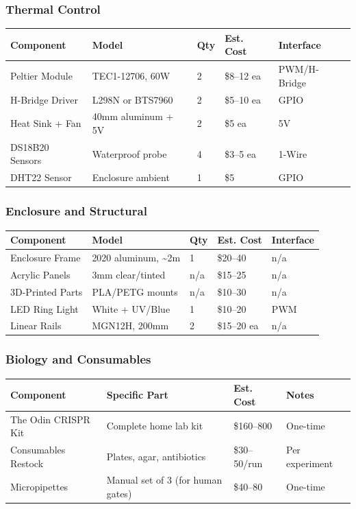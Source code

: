 \documentclass[11pt,letterpaper]{article}
\begin{document}
\subsubsection{Thermal Control}

{\centering\begin{tabularx}{\textwidth}{Y L{4.2cm} L{0.9cm} L{2.3cm} L{2.4cm}}
\toprule
\textbf{Component} & \textbf{Model} & \textbf{Qty} & \textbf{Est. Cost} & \textbf{Interface} \\
\midrule
Peltier Module & TEC1-12706, 60W & 2 & \$8--12 ea & PWM/H-Bridge \\
H-Bridge Driver & L298N or BTS7960 & 2 & \$5--10 ea & GPIO \\
Heat Sink + Fan & 40mm aluminum + 5V & 2 & \$5 ea & 5V \\
DS18B20 Sensors & Waterproof probe & 4 & \$3--5 ea & 1-Wire \\
DHT22 Sensor & Enclosure ambient & 1 & \$5 & GPIO \\
\bottomrule
\end{tabularx}\par}

\subsubsection{Enclosure and Structural}

{\centering\begin{tabularx}{\textwidth}{Y L{4.2cm} L{0.9cm} L{2.3cm} L{2.4cm}}
\toprule
\textbf{Component} & \textbf{Model} & \textbf{Qty} & \textbf{Est. Cost} & \textbf{Interface} \\
\midrule
Enclosure Frame & 2020 aluminum, \textasciitilde2m & 1 & \$20--40 & n/a \\
Acrylic Panels & 3mm clear/tinted & n/a & \$15--25 & n/a \\
3D-Printed Parts & PLA/PETG mounts & n/a & \$10--30 & n/a \\
LED Ring Light & White + UV/Blue & 1 & \$10--20 & PWM \\
Linear Rails & MGN12H, 200mm & 2 & \$15--20 ea & n/a \\
\bottomrule
\end{tabularx}\par}

\subsubsection{Biology and Consumables}

{\centering\begin{tabularx}{\textwidth}{L{3.8cm} Y L{2.5cm} L{2.6cm}}
\toprule
\textbf{Component} & \textbf{Specific Part} & \textbf{Est. Cost} & \textbf{Notes} \\
\midrule
The Odin CRISPR Kit & Complete home lab kit & \$160--800 & One-time \\
Consumables Restock & Plates, agar, antibiotics & \$30--50/run & Per experiment \\
Micropipettes & Manual set of 3 (for human gates) & \$40--80 & One-time \\
\bottomrule
\end{tabularx}\par}
\end{document}
